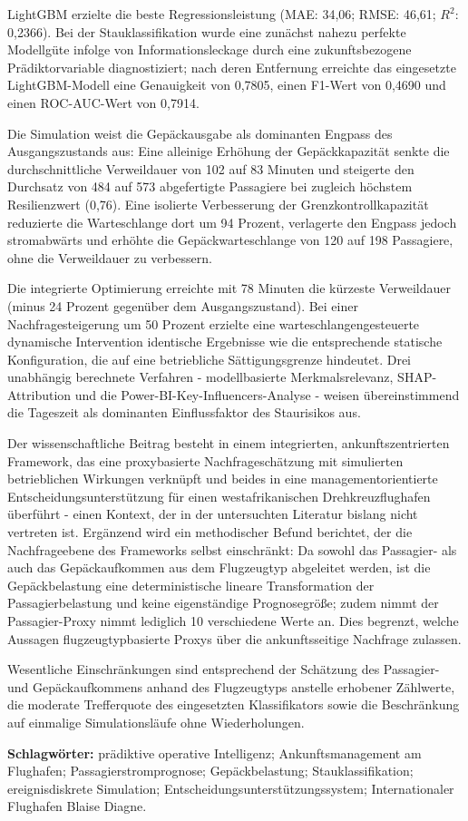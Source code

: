 LightGBM erzielte die beste Regressionsleistung
(MAE: 34,06; RMSE: 46,61; $R^2$: 0,2366). Bei der Stauklassifikation wurde
eine zunächst nahezu perfekte Modellgüte infolge von Informationsleckage
durch eine zukunftsbezogene Prädiktorvariable diagnostiziert; nach deren
Entfernung erreichte das eingesetzte LightGBM-Modell eine Genauigkeit von
0,7805, einen F1-Wert von 0,4690 und einen ROC-AUC-Wert von 0,7914.

Die Simulation weist die Gepäckausgabe als dominanten Engpass des
Ausgangszustands aus: Eine alleinige Erhöhung der Gepäckkapazität senkte die
durchschnittliche Verweildauer von 102 auf 83 Minuten und steigerte den
Durchsatz von 484 auf 573 abgefertigte Passagiere bei zugleich höchstem
Resilienzwert (0,76). Eine isolierte Verbesserung der Grenzkontrollkapazität
reduzierte die Warteschlange dort um 94 Prozent, verlagerte den Engpass jedoch
stromabwärts und erhöhte die Gepäckwarteschlange von 120 auf 198 Passagiere,
ohne die Verweildauer zu verbessern.

Die integrierte Optimierung erreichte mit 78 Minuten die kürzeste
Verweildauer (minus 24 Prozent gegenüber dem Ausgangszustand). Bei einer
Nachfragesteigerung um 50 Prozent erzielte eine warteschlangengesteuerte
dynamische Intervention identische Ergebnisse wie die entsprechende statische
Konfiguration, die auf eine betriebliche Sättigungsgrenze hindeutet. Drei
unabhängig berechnete Verfahren - modellbasierte Merkmalsrelevanz,
SHAP-Attribution und die Power-BI-Key-Influencers-Analyse - weisen
übereinstimmend die Tageszeit als dominanten Einflussfaktor des Staurisikos
aus.

Der wissenschaftliche Beitrag besteht in einem integrierten,
ankunftszentrierten Framework, das eine proxybasierte Nachfrageschätzung mit
simulierten betrieblichen Wirkungen verknüpft und beides in eine
managementorientierte Entscheidungsunterstützung für einen westafrikanischen
Drehkreuzflughafen überführt - einen Kontext, der in der untersuchten
Literatur bislang nicht vertreten ist. Ergänzend wird ein methodischer Befund
berichtet, der die Nachfrageebene des Frameworks selbst einschränkt: Da sowohl
das Passagier- als auch das Gepäckaufkommen aus dem Flugzeugtyp abgeleitet
werden, ist die Gepäckbelastung eine deterministische lineare Transformation
der Passagierbelastung und keine eigenständige Prognosegröße; zudem nimmt der
Passagier-Proxy nimmt lediglich 10 verschiedene Werte an. Dies begrenzt, welche
Aussagen flugzeugtypbasierte Proxys über die ankunftsseitige Nachfrage
zulassen.

Wesentliche Einschränkungen sind entsprechend der Schätzung des Passagier-
und Gepäckaufkommens anhand des Flugzeugtyps anstelle erhobener Zählwerte, die
moderate Trefferquote des eingesetzten Klassifikators sowie die Beschränkung
auf einmalige Simulationsläufe ohne Wiederholungen.

\vspace{0.5cm}

\noindent
\textbf{Schlagwörter:}
prädiktive operative Intelligenz;
Ankunftsmanagement am Flughafen;
Passagierstromprognose;
Gepäckbelastung;
Stauklassifikation;
ereignisdiskrete Simulation;
Entscheidungsunterstützungssystem;
Internationaler Flughafen Blaise Diagne.